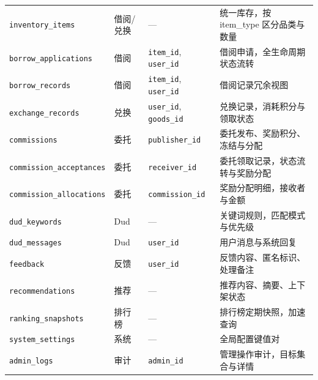\documentclass[a4paper,12pt]{article}
\begin{document}
\begin{table}[H]
{\begin{tabular}{p{2.5cm} p{1.4cm} p{4.2cm} p{5cm}}
      \texttt{inventory\_items}                           & 借阅/兑换        & —                                        & 统一库存，按 item\_type 区分品类与数量 \\
      \texttt{borrow\_}\linebreak\texttt{applications}    & 借阅           & \texttt{item\_id}, \texttt{user\_id}     & 借阅申请，全生命周期状态流转            \\
      \texttt{borrow\_records}                            & 借阅           & \texttt{item\_id}, \texttt{user\_id}     & 借阅记录冗余视图                  \\
      \texttt{exchange\_records}                          & 兑换           & \texttt{user\_id}, \texttt{goods\_id}    & 兑换记录，消耗积分与领取状态            \\
      \texttt{commissions}                                & 委托           & \texttt{publisher\_id}                   & 委托发布、奖励积分、冻结与分配           \\
      \texttt{commission\_}\linebreak\texttt{acceptances} & 委托           & \texttt{receiver\_id}                    & 委托领取记录，状态流转与奖励分配          \\
      \texttt{commission\_}\linebreak\texttt{allocations} & 委托           & \texttt{commission\_id}                  & 奖励分配明细，接收者与金额             \\
      \texttt{dud\_keywords}                              & Dud          & —                                        & 关键词规则，匹配模式与优先级            \\
      \texttt{dud\_messages}                              & Dud          & \texttt{user\_id}                        & 用户消息与系统回复                 \\
      \texttt{feedback}                                   & 反馈           & \texttt{user\_id}                        & 反馈内容、匿名标识、处理备注            \\
      \texttt{recommendations}                            & 推荐           & —                                        & 推荐内容、摘要、上下架状态             \\
      \texttt{ranking\_snapshots}                         & 排行榜          & —                                        & 排行榜定期快照，加速查询              \\
      \texttt{system\_settings}                           & 系统           & —                                        & 全局配置键值对                   \\
      \texttt{admin\_logs}                                & 审计           & \texttt{admin\_id}                       & 管理操作审计，目标集合与详情            \\
      \bottomrule
    \end{tabular}}
\end{table}
\end{document}
